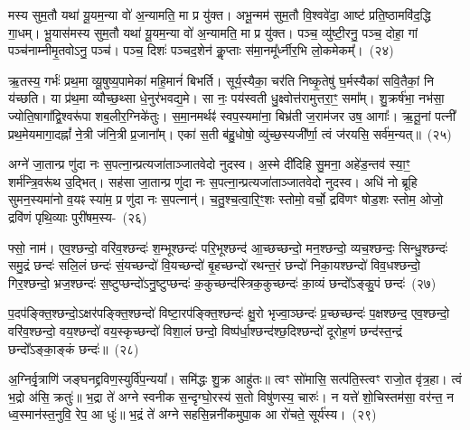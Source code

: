 मस्य सुम॒तौ यथा॑ यू॒यम॒न्या वो॑ अ॒न्यामति॒ मा प्र यु॑क्त। अभू॒न्मम॑ सुम॒तौ वि॒श्ववे॑दा॒ आष्ट॑ प्रति॒ष्ठामवि॑द॒द्धि गा॒धम्। भू॒यास॑मस्य सुम॒तौ यथा॑ यू॒यम॒न्या वो॑ अ॒न्यामति॒ मा प्र यु॑क्त। पञ्च॒ व्यु॑ष्टी॒रनु॒ पञ्च॒ दोहा॒ गां पञ्च॑नाम्नीमृ॒तवो\-ऽनु॒ पञ्च॑। पञ्च॒ दिशः॑ पञ्च\-द॒शेन॑ कॢ॒प्ताः स॑मा॒नमू᳚र्ध्नीर॒भि लो॒कमेकम्᳚।~(२४)\ip

ऋ॒तस्य॒ गर्भः॑ प्रथ॒मा व्यू॒षुष्य॒पामेका॑ महि॒मानं॑ बिभर्ति। सूर्य॒स्यैका॒ चर॑ति निष्कृ॒तेषु॑ घ॒र्मस्यैका॑ सवि॒तैकां॒ नि य॑च्छति। या प्र॑थ॒मा व्यौच्छ॒थ्सा धे॒नुर॑भवद्य॒मे। सा नः॒ पय॑स्वती धु॒क्ष्वोत्त॑रामुत्तरा॒ꣳ॒ समा᳚म्। शु॒क्रर्\mbox{}ष॑भा॒ नभ॑सा॒ ज्योति॒षागा᳚द्वि॒श्वरू॑पा शब॒लीर॒ग्निके॑तुः। स॒मा॒नमर्थꣴ॑ स्वप॒स्यमा॑ना॒ बिभ्र॑ती ज॒राम॑जर उष॒ आगाः᳚। ऋ॒तू॒नां पत्नी᳚ प्रथ॒मेयमागा॒दह्नां᳚ ने॒त्री ज॑नि॒त्री प्र॒जाना᳚म्। एका॑ स॒ती ब॑हु॒धोषो॒ व्यु॑च्छ॒स्यजी᳚र्णा॒ त्वं ज॑रयसि॒ सर्व॑म॒न्यत्॥~(२५)\ip

{\anuvakamend[{ऊर्ज॒मेका᳚ प्रतिमु॒ञ्चमा॑ना भू॒यास॒मेकं॒ पत्न्येका॒न्नविꣳ॑श॒तिश्च॑}]}%

अग्ने॑ जा॒तान्प्र णु॑दा नः स॒पत्ना॒न्प्रत्यजा॑ताञ्जातवेदो नुदस्व। अ॒स्मे दी॑दिहि सु॒मना॒ अहे॑ड॒न्तव॑ स्या॒ꣳ॒ शर्म॑न्त्रि॒वरू॑थ उ॒द्भित्। सह॑सा जा॒तान्प्र णु॑दा नः स॒पत्ना॒न्प्रत्यजा॑ताञ्जातवेदो नुदस्व। अधि॑ नो ब्रूहि सुमन॒स्यमा॑नो व॒यꣴ स्या॑म॒ प्र णु॑दा नः स॒पत्नान्॑। च॒तु॒श्च॒त्वा॒रि॒ꣳ॒शः स्तोमो॒ वर्चो॒ द्रवि॑णꣳ षोड॒शः स्तोम॒ ओजो॒ द्रवि॑णं पृथि॒व्याः पुरी॑षम॒स्य-~(२६)\ip

फ्सो॒ नाम॑। एव॒श्छन्दो॒ वरि॑व॒श्छन्दः॑ श॒म्भूश्छन्दः॑ परि॒भूश्छन्द॑ आ॒च्छच्छन्दो॒ मन॒श्छन्दो॒ व्यच॒श्छन्दः॒ सिन्धु॒श्छन्दः॑ समु॒द्रं छन्दः॑ सलि॒लं छन्दः॑ सं॒यच्छन्दो॑ वि॒यच्छन्दो॑ बृ॒हच्छन्दो॑ रथन्त॒रं छन्दो॑ निका॒यश्छन्दो॑ विव॒धश्छन्दो॒ गिर॒श्छन्दो॒ भ्रज॒श्छन्दः॑ स॒ष्टुप्छन्दो॑\-ऽनु॒ष्टुप्छन्दः॑ क॒कुच्छन्द॑स्त्रिक॒कुच्छन्दः॑ का॒व्यं छन्दो᳚\-ऽङ्कु॒पं छन्दः॑~(२७)\ip

प॒दप॑ङ्क्ति॒श्छन्दो॒\-ऽक्षर॑पङ्क्ति॒श्छन्दो॑ विष्टा॒रप॑ङ्क्ति॒श्छन्दः॑ क्षु॒रो भृज्वा॒ञ्छन्दः॑ प्र॒च्छच्छन्दः॑ प॒क्षश्छन्द॒ एव॒श्छन्दो॒ वरि॑व॒श्छन्दो॒ वय॒श्छन्दो॑ वय॒स्कृच्छन्दो॑ विशा॒लं छन्दो॒ विष्प॑र्धा॒श्छन्द॑श्छ॒दिश्छन्दो॑ दूरोह॒णं छन्द॑स्त॒न्द्रं छन्दो᳚\-ऽङ्का॒ङ्कं छन्दः॑॥~(२८)\ip

{\anuvakamend[{अ॒स्य॒ङ्कु॒पञ्छन्द॒स्त्रय॑स्त्रिꣳशच्च}]}%

अ॒ग्निर्वृ॒त्राणि॑ जङ्घनद्द्रविण॒स्युर्वि॑प॒न्यया᳚। समि॑द्धः शु॒क्र आहु॑तः॥ त्वꣳ सो॑मासि॒ सत्प॑ति॒स्त्वꣳ राजो॒त वृ॑त्र॒हा। त्वं भ॒द्रो अ॑सि॒ क्रतुः॑॥ भ॒द्रा ते॑ अग्ने स्वनीक स॒न्दृग्घो॒रस्य॑ स॒तो विषु॑णस्य॒ चारुः॑। न यत्ते॑ शो॒चिस्तम॑सा॒ वर॑न्त॒ न ध्व॒स्मान॑स्त॒नुवि॒ रेप॒ आ धुः॑॥ भ॒द्रं ते॑ अग्ने सहसि॒न्ननी॑कमुपा॒क आ रो॑चते॒ सूर्य॑स्य।~(२९)\ip

